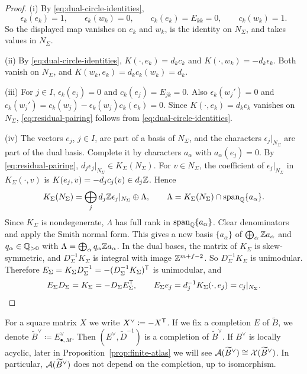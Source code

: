\documentclass[12pt, letter]{amsart}
\theoremstyle{definition}
\begin{document}
\begin{proof}
(i) By \eqref{eq:dual-circle-identities},
\[
 \epsilon_k(e_k)=1,\qquad \epsilon_k(w_k)=0,\qquad c_k(e_k)=E_{kk}=0,\qquad c_k(w_k)=1.
\]
So the displayed map vanishes on $e_k$ and $w_k$, is the identity on $N_\Sigma$, and takes values in $N_\Sigma$.

(ii) By \eqref{eq:dual-circle-identities}, $K(\cdot,e_k)=d_kc_k$ and $K(\cdot,w_k)=-d_k\epsilon_k$.
Both vanish on $N_\Sigma$, and $K(w_k,e_k)=d_kc_k(w_k)=d_k$.

(iii) For $j\in I$, $\epsilon_k(e_j)=0$ and $c_k(e_j)=E_{jk}=0$.
Also $\epsilon_k(w_j')=0$ and $c_k(w_j')=c_k(w_j)-\epsilon_k(w_j)c_k(e_k)=0$.
Since $K(\cdot,e_k)=d_kc_k$ vanishes on $N_\Sigma$, \eqref{eq:residual-pairing} follows from \eqref{eq:dual-circle-identities}.

(iv) The vectors $e_j$, $j\in I$, are part of a basis of $N_\Sigma$, and the characters $\epsilon_j|_{N_\Sigma}$ are part of the dual basis.
Complete it by characters $a_\alpha$ with $a_\alpha(e_j)=0$.
By \eqref{eq:residual-pairing}, $d_j\epsilon_j|_{N_\Sigma}\in K_\Sigma(N_\Sigma)$.
For $v\in N_\Sigma$, the coefficient of $\epsilon_j|_{N_\Sigma}$ in $K_\Sigma(\cdot,v)$ is $K(e_j,v)=-d_jc_j(v)\in d_j\mathbb{Z}$.
Hence
\[
 K_\Sigma(N_\Sigma)=\bigoplus_jd_j\mathbb{Z}\epsilon_j|_{N_\Sigma}\oplus\Lambda,\qquad \Lambda=K_\Sigma(N_\Sigma)\cap\operatorname{span}_{\mathbb{Q}}\{a_\alpha\}.
\]
Since $K_\Sigma$ is nondegenerate, $\Lambda$ has full rank in $\operatorname{span}_{\mathbb{Q}}\{a_\alpha\}$.
Clear denominators and apply the Smith normal form.
This gives a new basis $\{a_\alpha\}$ of $\bigoplus_\alpha\mathbb{Z} a_\alpha$ and $q_\alpha\in\mathbb{Q}_{>0}$ with $\Lambda=\bigoplus_\alpha q_\alpha\mathbb{Z} a_\alpha$.
In the dual bases, the matrix of $K_\Sigma$ is skew-symmetric, and $D_\Sigma^{-1}K_\Sigma$ is integral with image $\mathbb{Z}^{m+f-2}$.
So $D_\Sigma^{-1}K_\Sigma$ is unimodular.
Therefore $E_\Sigma=K_\Sigma D_\Sigma^{-1}=-(D_\Sigma^{-1}K_\Sigma)^{\mathsf T}$ is unimodular, and
\[
 E_\Sigma D_\Sigma=K_\Sigma=-D_\Sigma E_\Sigma^{\mathsf T},\qquad E_\Sigma e_j=d_j^{-1}K_\Sigma(\cdot,e_j)=c_j|_{N_\Sigma}.\qedhere
\]
\end{proof}

For a square matrix $X$ we write $X^\vee\coloneqq-X^{\mathsf T}$. If we fix a completion \(E\) of \(\widetilde B\), we denote \( \widetilde B^\vee \coloneqq E^\vee_{\bullet, M}\). 
Then $(E^\vee,\widetilde D^{-1})$ is a completion of $\widetilde B^\vee$.
If $B^\vee$ is locally acyclic, later in Proposition~\ref{prop:finite-atlas} we will see $\mathcal{A}(\widetilde B^\vee)\cong\mathcal{X}(\widetilde B^\vee)$. In particular, $\mathcal{A}(\widetilde B^\vee)$ does not depend on the completion, up to isomorphism.
\end{document}
